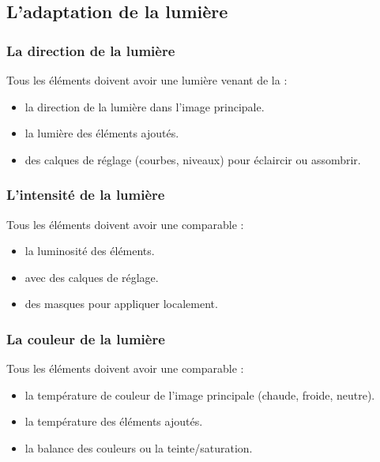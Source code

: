 \subsection{L'adaptation de la lumière}

\subsubsection{La direction de la lumière}

Tous les éléments doivent avoir une lumière venant de la  :

\begin{itemize}
    \item {} la direction de la lumière dans l'image principale.
    \item {} la lumière des éléments ajoutés.
    \item {} des calques de réglage (courbes, niveaux) pour éclaircir ou assombrir.
\end{itemize}

\subsubsection{L'intensité de la lumière}

Tous les éléments doivent avoir une  comparable :

\begin{itemize}
    \item {} la luminosité des éléments.
    \item {} avec des calques de réglage.
    \item {} des masques pour appliquer localement.
\end{itemize}

\subsubsection{La couleur de la lumière}

Tous les éléments doivent avoir une  comparable :

\begin{itemize}
    \item {} la température de couleur de l'image principale (chaude, froide, neutre).
    \item {} la température des éléments ajoutés.
    \item {} la balance des couleurs ou la teinte/saturation.
\end{itemize}

